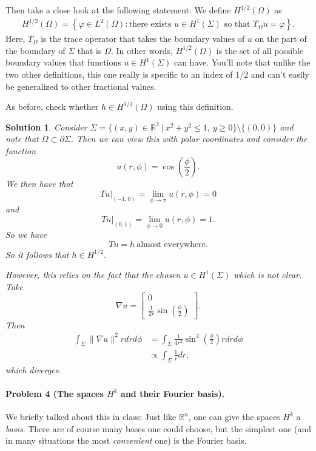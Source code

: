 \documentclass[leqno]{article}
\theoremstyle{nonumberplain}
\newtheorem{solution}{Solution}
\newcommand{\R}{\mathbb{R}}
\begin{document}
Then take a close look at the following statement: We define
$H^{1/2}(\Omega)$ as
\begin{align*}
  H^{1/2}(\Omega) = \left\{
    \varphi\in L^2(\Omega) : \text{there exists $u\in H^1(\Sigma)$ so
      that $T_\Omega u = \varphi$}
  \right\}.
\end{align*}
Here, $T_\Omega$ is the trace operator that takes the boundary values
of $u$ on the part of the boundary of $\Sigma$ that is $\Omega$. In
other words, $H^{1/2}(\Omega)$ is the set of all possible boundary
values that functions $u\in H^1(\Sigma)$ can have. You'll note that
unlike the two other definitions, this one really is specific to an
index of 1/2 and can't easily be generalized to other fractional
values.

As before, check whether $h\in H^{1/2}(\Omega)$ using this definition.



\begin{solution}
Consider $\Sigma=\{(x,y)\in \R^2 ~\vert~ x^2+y^2\leq 1, ~ y\geq 0\}\setminus \{(0,0)\}$ and note that $\Omega\subset \partial \Sigma$.  Then we can view this with polar coordinates and consider the function
\[
u(r,\phi) = \cos\left(\frac{\phi}{2}\right).
\]
We then have that 
\[
Tu|_{(-1,0)} = \lim_{\phi \to \pi} u(r,\phi) = 0
\]
and 
\[
Tu|_{(0,1)} = \lim_{\phi \to 0} u(r,\phi) = 1.
\]
So we have 
\[
Tu = h ~\textrm{almost everywhere.}
\]
So it follows that $h\in H^{1/2}$.

However, this relies on the fact that the chosen $u\in H^1(\Sigma)$ which is not clear.  Take
\[
\nabla u = \begin{bmatrix} 0 \\ \frac{1}{2r} \sin\left(\frac{\phi}{2}\right) \end{bmatrix}.
\]
Then
\begin{align*}
    \int_{\Sigma} \|\nabla u \|^2 rdrd\phi &= \int_\Sigma \frac{1}{4r^2}\sin^2\left(\frac{\phi}{2}\right)rdrd\phi\\
    &\propto \int_\Sigma \frac{1}{r}dr,
\end{align*}
which diverges.
\end{solution}
\pagebreak


\paragraph{Problem 4 (The spaces $H^{k}$ and their Fourier basis).}
We briefly talked about this in class: Just like $\R^n$, one can give
the spaces $H^k$ a \textit{basis}. There are of course many bases one
could choose, but the simplest one (and in many situations the most
\textit{convenient} one) is the Fourier basis.
\end{document}
